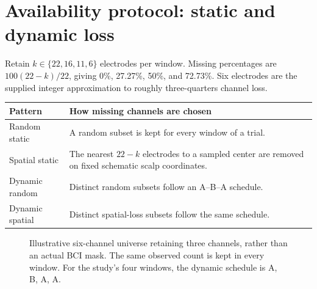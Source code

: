 \documentclass[11pt,a4paper]{article}
\begin{document}
\clearpage
\section{Availability protocol: static and dynamic loss}
Retain \(k\in\{22,16,11,6\}\) electrodes per window. Missing percentages are
\(100(22-k)/22\), giving 0\%, 27.27\%, 50\%, and 72.73\%. Six electrodes are
the supplied integer approximation to roughly three-quarters channel loss.

\begin{center}
\begin{tabularx}{\linewidth}{lY}
\toprule
Pattern & How missing channels are chosen \\
\midrule
Random static & A random subset is kept for every window of a trial. \\
Spatial static & The nearest \(22-k\) electrodes to a sampled center are removed
on fixed schematic scalp coordinates. \\
Dynamic random & Distinct random subsets follow an A--B--A schedule. \\
Dynamic spatial & Distinct spatial-loss subsets follow the same schedule. \\
\bottomrule
\end{tabularx}
\end{center}

\begin{figure}[h!]
\centering
{}
\caption{Illustrative six-channel universe retaining three channels, rather than
an actual BCI mask. The same observed count is kept in every window. For the
study's four windows, the dynamic schedule is A, B, A, A.}
\end{figure}
\end{document}
